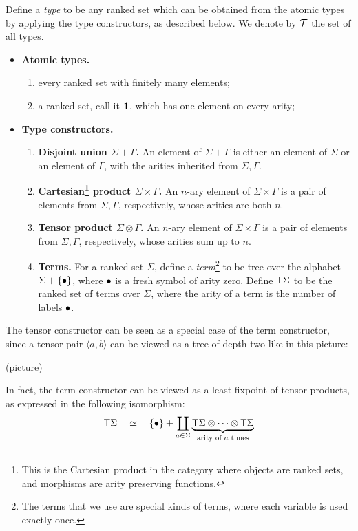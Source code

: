 \begin{definition}[Types]\label{def:types}
    Define a \emph{type} to be any ranked set which can be obtained from the atomic types by applying the type constructors, as described below. We denote by ${\mathcal T}$ the set of all types. 
    \begin{itemize}
        \item {\bf Atomic types.} 
           \begin{enumerate}
            \item every ranked set with finitely many elements;
            \item a ranked set, call it  $\mathbf{1}$, which has one element on every arity;
        \end{enumerate}
    \item {\bf Type constructors.} 
     \begin{enumerate}
        \item {\bf Disjoint union $\Sigma+\Gamma$.} An element of $\Sigma+\Gamma$ is either an element of $\Sigma$ or an element of $\Gamma$, with the arities inherited from $\Sigma,\Gamma$. 
        \item {\bf Cartesian\footnote{This is the Cartesian product in the category where objects are ranked sets, and morphisms are arity preserving functions.}  product $\Sigma \times \Gamma$.} An  $n$-ary element of $\Sigma \times \Gamma$ is a pair of elements from $\Sigma, \Gamma$, respectively, whose arities are both $n$.
        \item {\bf Tensor product $\Sigma \otimes \Gamma$.} An  $n$-ary element of $\Sigma \times \Gamma$ is a pair of elements from $\Sigma, \Gamma$, respectively, whose arities  sum up to $n$.
        \item {\bf Terms.} For a ranked set  $\Sigma$, define a \emph{term}\footnote{The terms that we use are special kinds of terms, where each variable is used exactly once.} to be tree over the alphabet $\Sigma + \{\bullet\}$, where $\bullet$ is a fresh symbol of arity zero. Define $\mathsf T \Sigma$ to be the ranked set of terms over $\Sigma$, where the arity of a term is the number of labels $\bullet$.
    \end{enumerate}  
    \end{itemize}
  
\end{definition}

\newcommand{\tensorpair}[2]{\langle #1, #2 \rangle}

The tensor constructor can be seen as a special case of the term constructor, since a tensor pair $\tensorpair a b$  can be viewed as a tree of depth two like in this picture:
\begin{center}
    (picture)
\end{center}
In fact, the term constructor can be viewed as a least fixpoint of tensor products, as expressed in the following isomorphism:
\begin{align*}
    \mathsf T \Sigma \quad \simeq \quad  \{\bullet\} + \coprod_{a \in \Sigma} \underbrace{\mathsf T \Sigma \otimes \cdots \otimes \mathsf T \Sigma}_{\text{arity of $a$ times}}
\end{align*}

